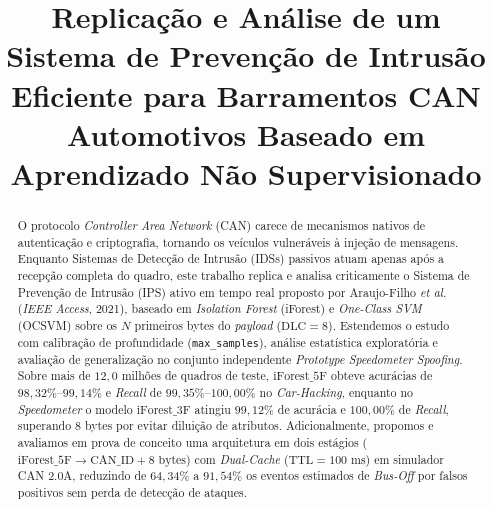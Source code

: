 \documentclass[conference]{IEEEtran}
\begin{document}
\title{Replicação e Análise de um Sistema de Prevenção de Intrusão Eficiente para Barramentos CAN Automotivos Baseado em Aprendizado Não Supervisionado}

\author{
\and
{}
}

\maketitle

\begin{abstract}
O protocolo \textit{Controller Area Network} (CAN) carece de mecanismos nativos de autenticação e criptografia, tornando os veículos vulneráveis à injeção de mensagens. Enquanto Sistemas de Detecção de Intrusão (IDSs) passivos atuam apenas após a recepção completa do quadro, este trabalho replica e analisa criticamente o Sistema de Prevenção de Intrusão (IPS) ativo em tempo real proposto por Araujo-Filho \textit{et al.} (\textit{IEEE Access}, 2021), baseado em \textit{Isolation Forest} (iForest) e \textit{One-Class SVM} (OCSVM) sobre os $N$ primeiros bytes do \textit{payload} ($\text{DLC}=8$). Estendemos o estudo com calibração de profundidade (\texttt{max\_samples}), análise estatística exploratória e avaliação de generalização no conjunto independente \textit{Prototype Speedometer Spoofing}. Sobre mais de $12{,}0$ milhões de quadros de teste, $\text{iForest\_5F}$ obteve acurácias de $98{,}32\%$--$99{,}14\%$ e \textit{Recall} de $99{,}35\%$--$100{,}00\%$ no \textit{Car-Hacking}, enquanto no \textit{Speedometer} o modelo $\text{iForest\_3F}$ atingiu $99{,}12\%$ de acurácia e $100{,}00\%$ de \textit{Recall}, superando $8$ bytes por evitar diluição de atributos. Adicionalmente, propomos e avaliamos em prova de conceito uma arquitetura em dois estágios ($\text{iForest\_5F} \rightarrow \text{CAN\_ID} + 8\text{ bytes}$) com \textit{Dual-Cache} ($\text{TTL}=100\text{ ms}$) em simulador CAN 2.0A, reduzindo de $64{,}34\%$ a $91{,}54\%$ os eventos estimados de \textit{Bus-Off} por falsos positivos sem perda de detecção de ataques.
\end{abstract}
\end{document}
